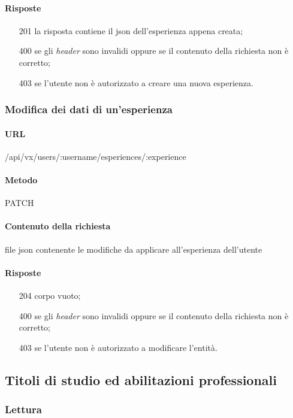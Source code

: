 \paragraph{Risposte}
\begin{itemize}
	\item[201] la risposta contiene il \gls{json} dell'esperienza appena creata;
	\item[400] se gli \emph{header} sono invalidi oppure se il contenuto della richiesta non è corretto;
	\item[403] se l'utente non è autorizzato a creare una nuova esperienza.
\end{itemize}

\subsubsection{Modifica dei dati di un'esperienza}
\paragraph{URL}
/api/vx/users/:username/esperiences/:experience
\paragraph{Metodo}
PATCH
\paragraph{Contenuto della richiesta}
file \gls{json} contenente le modifiche da applicare all'esperienza dell'utente
\paragraph{Risposte}
\begin{itemize}
	\item[204] corpo vuoto;
	\item[400] se gli \emph{header} sono invalidi oppure se il contenuto della richiesta non è corretto;
	\item[403] se l'utente non è autorizzato a modificare l'entità.
\end{itemize}


\subsection{Titoli di studio ed abilitazioni professionali}

\subsubsection{Lettura}
